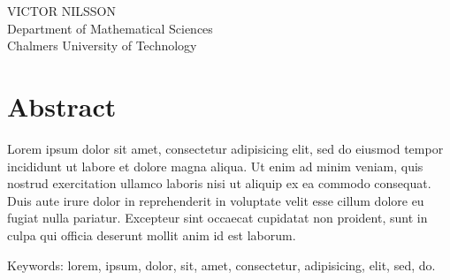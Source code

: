 \titlename\\
\subtitlename\\
VICTOR NILSSON\\
Department of Mathematical Sciences\\
Chalmers University of Technology \setlength{\parskip}{0.5cm}


\thispagestyle{plain}			%
\setlength{\parskip}{0pt plus 1.0pt}
\section*{Abstract}
Lorem ipsum dolor sit amet, consectetur adipisicing elit, sed do eiusmod tempor incididunt ut labore et dolore magna aliqua. Ut enim ad minim veniam, quis nostrud exercitation ullamco laboris nisi ut aliquip ex ea commodo consequat. Duis aute irure dolor in reprehenderit in voluptate velit esse cillum dolore eu fugiat nulla pariatur. Excepteur sint occaecat cupidatat non proident, sunt in culpa qui officia deserunt mollit anim id est laborum.

\vfill
Keywords: lorem, ipsum, dolor, sit, amet, consectetur, adipisicing, elit, sed, do.

\newpage				%
\thispagestyle{empty}
\mbox{}

